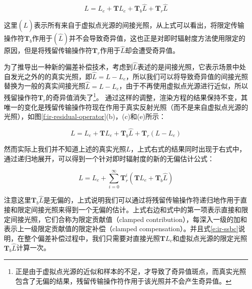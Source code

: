 \begin{equation}
	L=L_e+\mathbf{T}L_e+\mathbf{T}_b\hat{L}+\mathbf{T}_r\hat{L}
\end{equation}

\noindent 这里$(\hat{L})$表示所有来自于虚拟点光源的间接光照，从上式可以看出，将限定传输操作符$\mathbf{T}_b$作用于$(\hat{L})$并不会导致奇异值，这也正是对即时辐射度方法使用限定的原因，但是将残留传输操作符$\mathbf{T}_r$作用于$\hat{L}$却会遭受奇异值。

为了推导出一种新的偏差补偿技术，考虑到$\hat{L}$表述的是间接光照，它表示场景中处自发光之外的的真实光照，即$\hat{L}=L-L_e$，所以我们可以将导致奇异值的间接光照替换为一般的真实间接光照$\hat{L}=L-L_e$，由于不再使用虚拟点光源进行近似，所以残留操作符$\mathbf{T}_r$的奇异值消失了\footnote{正是由于虚拟点光源的近似和样本的不足，才导致了奇异值斑点，而真实光照包含了无偏的结果，残留传输操作符作用于该光照并不会产生奇异值。}。 通过这样的调整，渲染方程的结果保持不变，其唯一的变化是残留传输操作符现在作用于真实反射光照（而不是来自虚拟点光源的光照），如图\ref{f:ir-residual-operator}(b)，(c)和(e)所示：

\begin{equation}
	L=L_e+\mathbf{T}L_e+\mathbf{T}_b\hat{L}+\mathbf{T}_r(L-L_e)
\end{equation}

\noindent 然而实际上我们并不知道上述的真实光照$L$，上式右式的结果同时出现于右式中，通过递归地展开，可以得到一个针对即时辐射度的新的无偏估计公式：

\begin{equation}\label{e:ir-ssbc}
	L=L_e+\sum^{\infty}_{i=0}\mathbf{T}^{i}_r(\mathbf{T}L_e+\mathbf{T}_b\hat{L})
\end{equation}

\noindent 注意这里$\mathbf{T}_b\hat{L}$是无偏的，上式说明我们可以通过将残留传输操作符递归地作用于直接和限定间接光照来得到一个无偏的估计。上式右边和式中的第一项表示直接和限定间接光照，它们合称为限定贡献值（clamped contribution），每深入一级的加和表示上一级限定贡献值的限定补偿（clamped compensation）。并且式\ref{e:ir-ssbc}说明，在整个偏差补偿过程中，我们只需要对直接光照$\mathbf{T}L_e$和虚拟点光源的限定光照$\mathbf{T}_b\hat{L}$计算一次。

